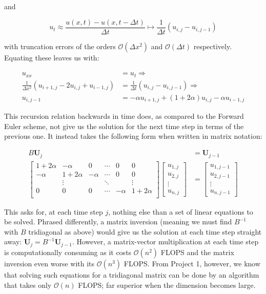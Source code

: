 \documentclass[a4paper, 11pt, notitlepage,english]{article}
\begin{document}
and

\begin{equation}
u_{t} \approx \frac{u(x,t)-u(x,t-\Delta t)}{\Delta t} \mapsto \frac{1}{\Delta t} (u_{i,j}-u_{i,j-1})
\label{eq:Backward_ut}
\end{equation}

with truncation errors of the orders $\mathcal{O}(\Delta x^2)$ and $\mathcal{O}(\Delta t)$ respectively. Equating these leaves us with:

\begin{align}
u_{xx} &= u_t \Rightarrow \\
 \frac{1}{\Delta x^2} (u_{i+1,j}-2u_{i,j}+u_{i-1,j}) &= \frac{1}{\Delta t} (u_{i,j}-u_{i,j-1}) \Rightarrow \\
 u_{i,j-1} &= -\alpha u_{i+1,j} + (1+2\alpha)u_{i,j} - \alpha u_{i-1,j}
\label{eq:Backward_Euler_scheme}
\end{align}

This recursion relation backwards in time does, as compared to the Forward Euler scheme, not give us the solution for the next time step in terms of the previous one. It instead takes the following form when written in matrix notation:

\begin{align}
B \boldsymbol{U}_j &= \boldsymbol{U}_{j-1} \\
\begin{bmatrix}
 1+2\alpha & -\alpha & 0 & \cdots & 0 & 0 \\
 -\alpha & 1+2\alpha & -\alpha & \cdots & 0 & 0 \\
  & \vdots & & \ddots & & \vdots \\
 0 & 0 & 0 & \cdots & -\alpha & 1+2\alpha \\
\end{bmatrix}
\begin{bmatrix}
u_{1,j} \\ u_{2,j} \\ \vdots \\ u_{n,j}
\end{bmatrix}
&=
\begin{bmatrix}
u_{1,j-1} \\ u_{2,j-1} \\ \vdots \\ u_{n,j-1}
\end{bmatrix}
\label{eq:Backwards_Euler_matrix}
\end{align}

This asks for, at each time step $j$, nothing else than a set of linear equations to be solved. Phrased differently, a matrix inversion (meaning we must find $B^{-1}$ with $B$ tridiagonal as above) would give us the solution at each time step straight away: $\boldsymbol{U}_j = B^{-1} \boldsymbol{U}_{j-1}$. However, a matrix-vector multiplication at each time step is computationally consuming as it costs $\mathcal{O}(n^2)$ FLOPS and the matrix inversion even worse with its $\mathcal{O}(n^3)$ FLOPS. From Project 1, however, we know that solving such equations for a tridiagonal matrix can be done by an algorithm that takes only $\mathcal{O}(n)$ FLOPS; far superior when the dimension becomes large.
\end{document}
